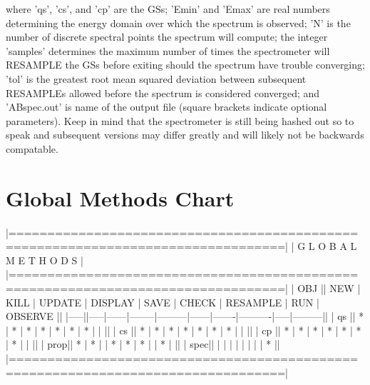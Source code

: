  where 'qs', 'cs', and 'cp' are the G\-Ss; 'Emin' and 'Emax' are real numbers determining the energy domain over which the spectrum is observed; 'N' is the number of discrete spectral points the spectrum will compute; the integer 'samples' determines the maximum number of times the spectrometer will R\-E\-S\-A\-M\-P\-L\-E the G\-Ss before exiting should the spectrum have trouble converging; 'tol' is the greatest root mean squared deviation between subsequent R\-E\-S\-A\-M\-P\-L\-Es allowed before the spectrum is considered converged; and 'A\-Bspec.\-out' is name of the output file (square brackets indicate optional parameters). Keep in mind that the spectrometer is still being hashed out so to speak and subsequent versions may differ greatly and will likely not be backwards compatable.\par
 \hypertarget{_interface_Global_Methods_Chart}{}\section{Global Methods Chart}\label{_interface_Global_Methods_Chart}
\begin{DoxyVerb}|=================================================================================|
|                           G L O B A L   M E T H O D S                           |
|=================================================================================|
| OBJ || NEW | KILL | UPDATE | DISPLAY | SAVE | CHECK | RESAMPLE | RUN | OBSERVE ||
|-----||-----|------|--------|---------|------|-------|----------|-----|---------||
| qs  ||  *  |  *   |   *    |   *     |  *   |   *   |    *     |     |         ||
| cs  ||  *  |  *   |   *    |   *     |  *   |   *   |    *     |     |         ||
| cp  ||  *  |  *   |   *    |   *     |  *   |   *   |    *     |     |         ||
| prop||  *  |  *   |        |   *     |  *   |   *   |          |  *  |         ||
| spec||     |      |        |         |      |       |          |     |    *    ||
|=================================================================================|
\end{DoxyVerb}
 